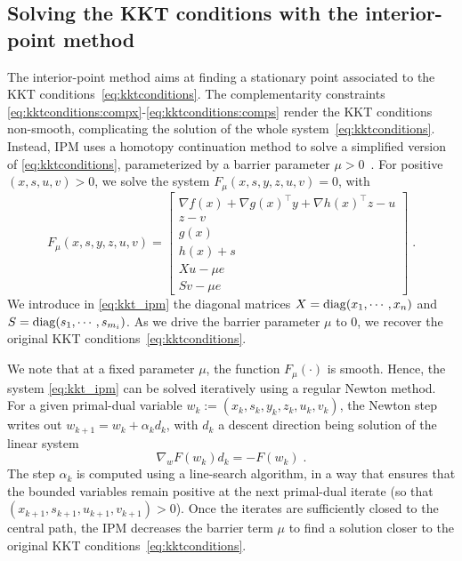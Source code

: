 \subsection{Solving the KKT conditions with the interior-point method}
\label{sec:ipm:kkt}
The interior-point method aims at finding a stationary point
associated to the KKT conditions~\eqref{eq:kktconditions}.
The complementarity constraints \eqref{eq:kktconditions:compx}-\eqref{eq:kktconditions:comps}
render the KKT conditions non-smooth, complicating the solution of
the whole system~\eqref{eq:kktconditions}.
Instead, IPM uses a homotopy continuation method to solve a simplified
version of \eqref{eq:kktconditions}, parameterized by a barrier
parameter $\mu > 0$~\cite[Chapter 19]{nocedal_numerical_2006}.
For positive $(x, s, u, v) > 0$, we solve the system
$F_\mu(x, s, y, z, u, v) = 0$, with
\begin{equation}
  \label{eq:kkt_ipm}
  F_\mu(x, s, y, z, u, v) =
  \begin{bmatrix}
       \nabla f(x) + \nabla g(x)^\top y + \nabla h(x)^\top z - u  \\
       z - v  \\
       g(x)  \\
       h(x) + s  \\
       X u - \mu e  \\
       S v - \mu e
  \end{bmatrix}
   \; .
\end{equation}
We introduce in \eqref{eq:kkt_ipm} the diagonal matrices $X = \operatorname{diag}(x_1, \cdots, x_n)$
and $S = \operatorname{diag}(s_1, \cdots, s_{m_i})$.
As we drive the barrier parameter $\mu$ to $0$, we recover the original
KKT conditions~\eqref{eq:kktconditions}.

We note that at a fixed parameter $\mu$, the function $F_\mu(\cdot)$
is smooth. Hence, the system \eqref{eq:kkt_ipm} can be solved iteratively
using a regular Newton method. For a given primal-dual variable
$w_k := (x_k, s_k, y_k, z_k, u_k, v_k)$, the Newton step writes out
$w_{k+1} = w_k + \alpha_k d_k$, with $d_k$ a descent
direction being solution of the linear system
\begin{equation}
  \label{eq:newton_step}
  \nabla_w F(w_k) d_k = -F(w_k) \; .
\end{equation}
The step $\alpha_k$ is computed using a line-search algorithm, in a way
that ensures that the bounded variables remain positive
at the next primal-dual iterate (so that $(x_{k+1}, s_{k+1}, u_{k+1}, v_{k+1}) > 0$).
Once the iterates are sufficiently closed to the central path,
the IPM decreases the barrier term $\mu$ to find a solution closer to
the original KKT conditions~\eqref{eq:kktconditions}.

